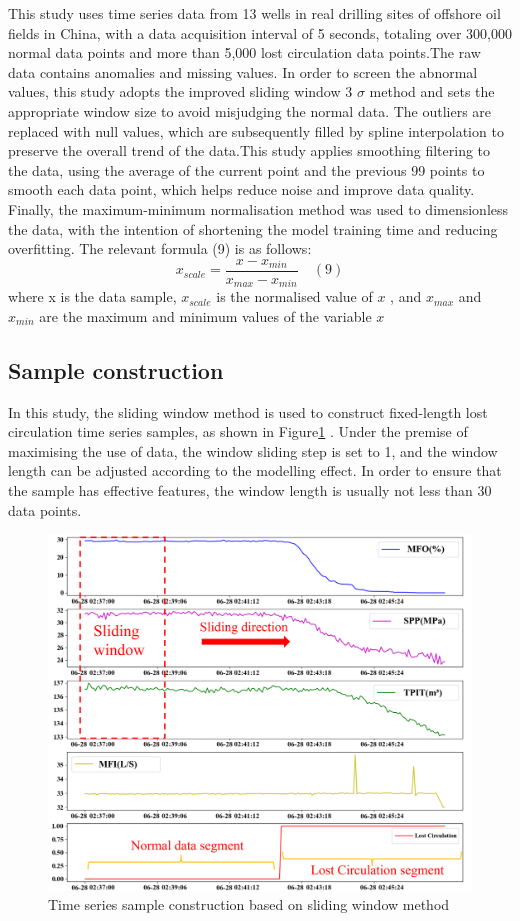 \documentclass[journal,article,submit,pdftex,moreauthors]{Definitions/mdpi}
\begin{document}
This study uses time series data from 13 wells in real drilling sites of offshore oil fields in China, with a data acquisition interval of 5 seconds, totaling over 300,000 normal data points and more than 5,000 lost circulation data points.The raw data contains anomalies and missing values. In order to screen the abnormal values, this study adopts the improved sliding window 3 \(\sigma\) method and sets the appropriate window size to avoid misjudging the normal data. The outliers are replaced with null values, which are subsequently filled by spline interpolation to preserve the overall trend of the data.This study applies smoothing filtering to the data, using the average of the current point and the previous 99 points to smooth each data point, which helps reduce noise and improve data quality. Finally, the maximum-minimum normalisation method was used to dimensionless the data, with the intention of shortening the model training time and reducing overfitting. The relevant formula (9) is as follows:
$$ x _ { s c a l e } = \frac { x - x _ { m i n } } { x _ { m a x } - x _ { m i n } }\quad (9)$$
where x is the data sample, \({{x}_{scale}}\) is the normalised value of \({{x}}\) , and \({{x}_{max}}\)  and \({{x}_{min}}\)  are the maximum and minimum values of the variable \({{x}}\)
\subsection{Sample construction}

In this study, the sliding window method is used to construct fixed-length  lost circulation time series samples, as shown in Figure\ref{fig:Time series sample construction based on sliding window method} . Under the premise of maximising the use of data, the window sliding step is set to 1, and the window length can be adjusted according to the modelling effect. In order to ensure that the sample has effective features, the window length is usually not less than 30 data points.

\begin{figure}[h]
    \centering
    \includegraphics[width=0.75\linewidth]{图片/滑动窗口.png}
    \caption{Time series sample construction based on sliding window method}
    \label{fig:Time series sample construction based on sliding window method}
\end{figure}
\end{document}
